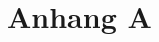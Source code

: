 %
%
\glsresetall

\let\raggedsection\centering 
\chapter{Anhang A}\label{chap.appendix_a}
\let\raggedsection\raggedright 

